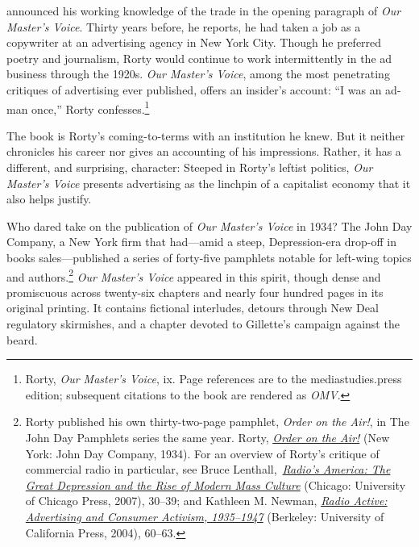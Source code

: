 \documentclass[twoside,nohyper,openany,nobib]{tufte-book}
\begin{document}
\vspace{0.5in}

 announced his working knowledge of the trade in the opening
paragraph of \emph{Our Master's Voice}. Thirty years before, he reports,
he had taken a job as a copywriter at an advertising agency in New York
City. Though he preferred poetry and journalism, Rorty would continue to
work intermittently in the ad business through the 1920s. \emph{Our
Master's Voice}, among the most penetrating critiques of advertising
ever published, offers an insider's account: ``I was an ad-man once,''
Rorty confesses.\footnote{Rorty, \emph{Our Master's Voice}, ix. Page references are to the
  mediastudies.press edition; subsequent citations to the book are
  rendered as \emph{OMV}.}

The book is Rorty's coming-to-terms with an institution he knew. But it
neither chronicles his career nor gives an accounting of his
impressions. Rather, it has a different, and surprising, character:
Steeped in Rorty's leftist politics, \emph{Our Master's Voice} presents
advertising as the linchpin of a capitalist economy that it also helps
justify.

Who dared take on the publication of \emph{Our Master's Voice} in 1934?
The John Day Company, a New York firm that had---amid a steep,
Depression-era drop-off in books sales---published a series of
forty-five pamphlets notable for left-wing topics and authors.\footnote{Rorty published his own thirty-two-page pamphlet, \emph{Order on the
  Air!}, in The John Day Pamphlets series the same year. Rorty,
  \emph{\href{https://books.google.com/books/about/Order_on_the_Air.html?id=2vBCAAAAIAAJ}{Order
  on the Air!}} (New York: John Day Company, 1934). For an overview of
  Rorty's critique of commercial radio in particular, see Bruce
  Lenthall,~\emph{\href{http://www.worldcat.org/oclc/84838887}{Radio's
  America: The Great Depression and the Rise of Modern Mass Culture}}
  (Chicago: University of Chicago Press, 2007), 30--39; and Kathleen M.
  Newman, \emph{\href{http://www.worldcat.org/oclc/473847893}{Radio
  Active: Advertising and Consumer Activism, 1935--1947}} (Berkeley:
  University of California Press, 2004), 60--63.}
\emph{Our Master's Voice} appeared in this spirit, though dense and
promiscuous across twenty-six chapters and nearly four hundred pages in
its original printing. It contains fictional interludes, detours through
New Deal regulatory skirmishes, and a chapter devoted to Gillette's
campaign against the beard.
\end{document}
